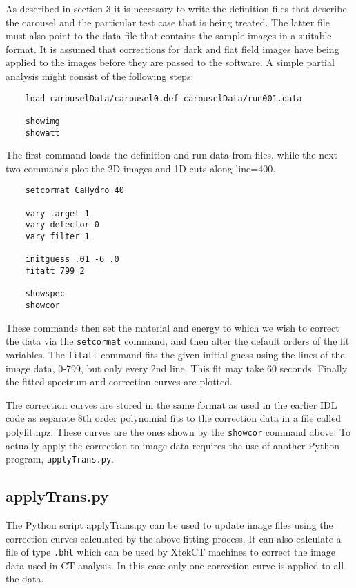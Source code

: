 \documentclass[a4paper,12pt]{article}
\begin{document}
As described in section 3 it is necessary to write the definition files that describe the carousel and the particular
test case that is being treated.
The latter file must also point to the data file that contains the sample images in a suitable format.
It is assumed that corrections for dark and flat field images have being applied to the images before they are
passed to the software.
A simple partial analysis might consist of the following steps:
\begin{verbatim}
    load carouselData/carousel0.def carouselData/run001.data

    showimg
    showatt
\end{verbatim}
The first command loads the definition and run data from files, while the next two commands
plot the 2D images and 1D cuts along line=400.

\begin{verbatim}
    setcormat CaHydro 40

    vary target 1
    vary detector 0
    vary filter 1

    initguess .01 -6 .0
    fitatt 799 2

    showspec
    showcor
\end{verbatim}
These commands then set the material and energy to which we wish to correct the data via the \texttt{setcormat}
command, and then alter the default orders of the fit variables.
The \texttt{fitatt} command fits the given initial guess using the lines of the image data, 0-799, but only every 2nd line.
This fit may take 60 seconds. Finally the fitted spectrum and correction curves are plotted.

The correction curves are stored in the same format as used in the earlier IDL code as separate 8th order polynomial
fits to the correction data in a file called polyfit.npz.
These curves are the ones shown by the \texttt{showcor} command above.
To actually apply the correction to image data requires the use of another Python program, \texttt{applyTrans.py}.

\subsection{applyTrans.py}

The Python script applyTrans.py can be used to update image files using the correction curves calculated by
the above fitting process.
It can also calculate a file of type \texttt{.bht} which can be used by XtekCT machines to correct the image
data used in CT analysis. In this case only one correction curve is applied to all the data.
\end{document}

